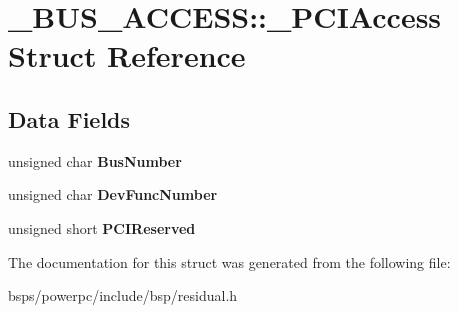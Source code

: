 \hypertarget{struct__BUS__ACCESS_1_1__PCIAccess}{}\section{\+\_\+\+B\+U\+S\+\_\+\+A\+C\+C\+E\+SS\+::\+\_\+\+P\+C\+I\+Access Struct Reference}
\label{struct__BUS__ACCESS_1_1__PCIAccess}
\subsection*{Data Fields}
\begin{DoxyCompactItemize}
\item 
\mbox{\label{struct__BUS__ACCESS_1_1__PCIAccess_a948f1960a5052ff719373cd710708a98}} 
unsigned char {\bfseries Bus\+Number}
\item 
\mbox{\label{struct__BUS__ACCESS_1_1__PCIAccess_a3ef5baff7bd54abb90b00125dbd4b92d}} 
unsigned char {\bfseries Dev\+Func\+Number}
\item 
\mbox{\label{struct__BUS__ACCESS_1_1__PCIAccess_acd9508f5a39ce76de57bacf1e688a3c8}} 
unsigned short {\bfseries P\+C\+I\+Reserved}
\end{DoxyCompactItemize}


The documentation for this struct was generated from the following file\+:\begin{DoxyCompactItemize}
\item 
bsps/powerpc/include/bsp/residual.\+h\end{DoxyCompactItemize}

